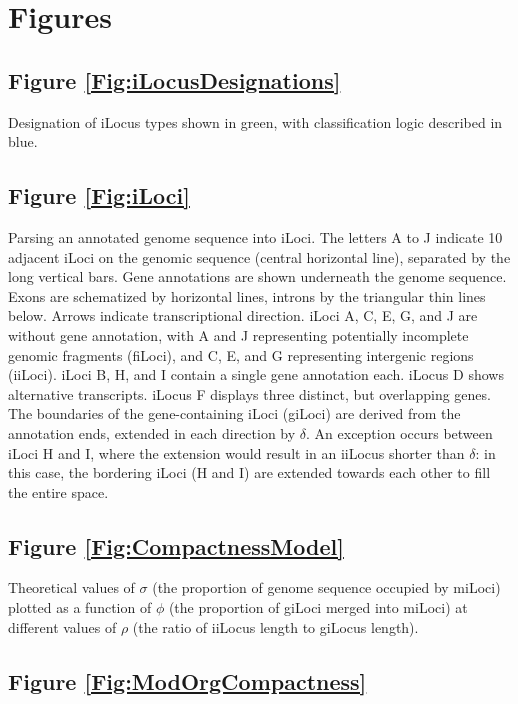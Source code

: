 \section{Figures} %

\subsection*{Figure \ref{Fig:iLocusDesignations}}

\noindent
Designation of iLocus types shown in green, with classification logic described in blue.

\subsection*{Figure \ref{Fig:iLoci}}

\noindent
Parsing an annotated genome sequence into iLoci.
The letters A to J indicate 10 adjacent iLoci on the genomic sequence (central horizontal line), separated by the long vertical bars.
Gene annotations are shown underneath the genome sequence.
Exons are schematized by horizontal lines, introns by the triangular thin lines below.
Arrows indicate transcriptional direction.
iLoci A, C, E, G, and J are without gene annotation, with A and J representing potentially incomplete genomic fragments (fiLoci), and C, E, and G representing intergenic regions (iiLoci).
iLoci B, H, and I contain a single gene annotation each.
iLocus D shows alternative transcripts.
iLocus F displays three distinct, but overlapping genes.
The boundaries of the gene-containing iLoci (giLoci) are derived from the annotation ends, extended in each direction by $\delta$.
An exception occurs between iLoci H and I, where the extension would result in an iiLocus shorter than $\delta$: in this case, the bordering iLoci (H and I) are extended towards each other to fill the entire space.

\subsection*{Figure \ref{Fig:CompactnessModel}}

\noindent
Theoretical values of $\sigma$ (the proportion of genome sequence occupied by miLoci) plotted as a function of $\phi$ (the proportion of giLoci merged into miLoci) at different values of $\rho$ (the ratio of iiLocus length to giLocus length).

\subsection*{Figure \ref{Fig:ModOrgCompactness}}

